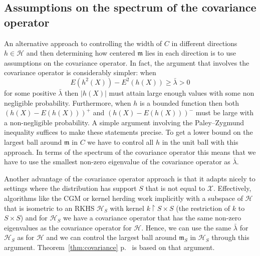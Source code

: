 \documentclass[10pt]{amsart}
\theoremstyle{definition}\newtheorem{defi}[theo]{Definition}\newtheorem{rema}[theo]{Remark}\newtheorem{exam}[theo]{Example}\newtheorem{exem}[theo]{Example}\newtheorem{nota}[theo]{Notation}
\theoremstyle{remark}
\newcommand{\restrr}
{\!\!\upharpoonright\!\!}
\newcommand{\X}{\mathcal{X}}
\newcommand{\cH}{\mathcal{H}}
\newcommand{\mean}{\mathfrak{m}}
\begin{document}
\subsection{Assumptions on the spectrum of the covariance operator}

An alternative approach to controlling the width of $C$ in different directions $h \in \cH$ and then determining how centered $\mean$ lies in each direction is to use assumptions on the covariance operator. In fact, the argument that involves the covariance operator is considerably simpler: when
\[
E(h^2(X)) - E^2(h(X)) \geq \bar \lambda > 0
\]
for some positive $\bar \lambda$ then $|h(X)|$ must attain large enough values with some non negligible probability. Furthermore, when $h$ is a bounded function then both $(h(X) - E(h(X)))^+$ and $(h(X)-E(h(X)))^-$ must be large with a non-negligible probability. A simple argument involving the Paley--Zygmund inequality suffices to make these statements precise. To get a lower bound on the largest ball around $\mean$ in $C$ we have to control all $h$ in the unit ball with this approach. In terms of the spectrum of the covariance operator this means that we have to use the smallest non-zero eigenvalue of the covariance operator as $\bar \lambda$.

Another advantage of the covariance operator approach is that it adapts nicely to settings where the distribution has support $S$ that is not equal to $\X$. Effectively, algorithms like the CGM or kernel herding work implicitly with a subspace of $\cH$ that is isometric to an RKHS $\cH_S$ with kernel $k\restrr S \times S$ (the restriction of $k$ to $S \times S$) and for $\cH_S$ we have a covariance operator that has the same non-zero eigenvalues as the covariance operator for $\cH$. Hence, we can use the same $\bar \lambda$ for $\cH_S$ as for $\cH$ and we can control the largest ball around $\mean_S$ in $\cH_S$ through this argument. Theorem~\ref{thm:covariance} p.~\pageref{thm:covariance} is based on that argument.
\end{document}
